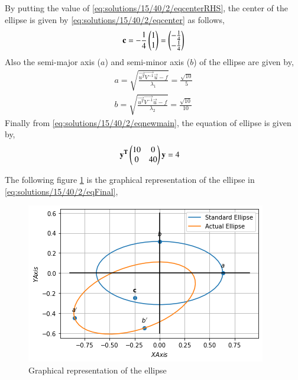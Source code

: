 By putting the value of \eqref{eq:solutions/15/40/2/eqcenterRHS}, the center of the ellipse is given by \eqref{eq:solutions/15/40/2/eqcenter} as follows,
\begin{align}
\mathbf{c} = -\frac{1}{4}\begin{pmatrix}1\\1\end{pmatrix} = \begin{pmatrix}-\frac{1}{4}\\-\frac{1}{4}\end{pmatrix}
\end{align}
Also the semi-major axis ($a$) and semi-minor axis ($b$) of the ellipse are given by,
\begin{align}
a = \sqrt{\frac{\vec{u^T}\vec{V^{-1}}\vec{u}-f}{\lambda_1}}=\frac{\sqrt{10}}{5}\\
b = \sqrt{\frac{\vec{u^T}\vec{V^{-1}}\vec{u}-f}{\lambda_2}}=\frac{\sqrt{10}}{10}
\end{align}
Finally from \eqref{eq:solutions/15/40/2/eqnewmain}, the equation of ellipse is given by,
\begin{align}
&\mathbf{y^T}\begin{pmatrix}10&0\\0&40\end{pmatrix}\mathbf{y}=4\label{eq:solutions/15/40/2/eqFinal}
\end{align}

The following figure \ref{eq:solutions/15/40/2/fig:my_label}
is the graphical representation of the ellipse in \eqref{eq:solutions/15/40/2/eqFinal},
\begin{figure}[t]
\centering
\includegraphics[width = \columnwidth]{./solutions/40/2/Ellipse.png}
\caption{Graphical representation of the ellipse}
\label{eq:solutions/15/40/2/fig:my_label}
\end{figure}

